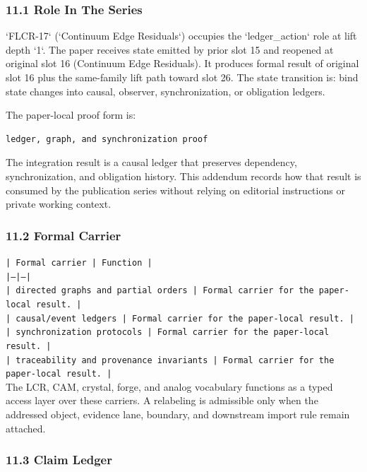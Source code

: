 \documentclass[11pt]{article}
\begin{document}
\subsubsection*{11.1 Role In The Series}

`FLCR-17` (`Continuum Edge Residuals`) occupies the `ledger\_action` role at lift depth `1`.
The paper receives state emitted by prior slot 15 and reopened at original slot 16 (Continuum Edge Residuals). It produces formal result of original slot 16 plus the same-family lift path toward slot 26. The state transition is:
bind state changes into causal, observer, synchronization, or obligation ledgers.

The paper-local proof form is:

\begin{verbatim}
ledger, graph, and synchronization proof
\end{verbatim}

The integration result is a causal ledger that preserves dependency, synchronization, and obligation history. This addendum records how that result is
consumed by the publication series without relying on editorial instructions or
private working context.

\subsubsection*{11.2 Formal Carrier}

\noindent\texttt{| Formal carrier | Function |}\\
\noindent\texttt{|---|---|}\\
\noindent\texttt{| directed graphs and partial orders | Formal carrier for the paper-local result. |}\\
\noindent\texttt{| causal/event ledgers | Formal carrier for the paper-local result. |}\\
\noindent\texttt{| synchronization protocols | Formal carrier for the paper-local result. |}\\
\noindent\texttt{| traceability and provenance invariants | Formal carrier for the paper-local result. |}\\

The LCR, CAM, crystal, forge, and analog vocabulary functions as a typed access
layer over these carriers. A relabeling is admissible only when the addressed
object, evidence lane, boundary, and downstream import rule remain attached.

\subsubsection*{11.3 Claim Ledger}
\end{document}
